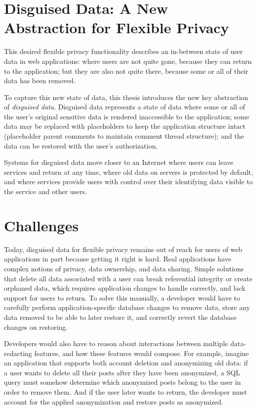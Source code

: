 \section{Disguised Data: A New Abstraction for Flexible Privacy}
%
This desired flexible privacy functionality describes an in-between state of
user data in web applications: where users are not quite gone, because they can
return to the application; but they are also not quite there, because some or
all of their data has been removed.
%

%
To capture this new state of data, this thesis introduces the new key
abstraction of \emph{disguised data}.  Disguised data represents a state of data
where \one{} some or all of the user's original sensitive data is rendered
inaccessible to the application; \two{} some data may be replaced with
placeholders to keep the application structure intact (\eg placeholder parent
comments to maintain comment thread structure); and \three{} the data can be
restored with the user's authorization.
%

%
Systems for disguised data move closer to an Internet where
users can leave services and return at any time, where old data on servers is
protected by default, and where services provide users with control over their
identifying data visible to the service and other users.
%

\section{Challenges} 
Today, disguised data for flexible privacy remains out of reach for users of
web applications in part because getting it right is hard. 
%
Real applications have complex notions of privacy, data ownership, and data
sharing.
%
Simple solutions that \eg delete all data associated with a user can break
referential integrity or create orphaned data, which requires application
changes to handle correctly, and lack support for users to return.
%
To solve this manually, a developer would have to carefully perform
application-specific database changes to remove data, store any data removed to
be able to later restore it, and correctly revert the database changes on
restoring.

%
Developers would also have to reason about interactions between multiple
data-redacting features, and how these features would compose.
%
For example, imagine an application that supports both account deletion and
anonymizing old data: if a user wants to delete all their posts after they have
been anonymized, a SQL query must somehow determine which anonymized posts
belong to the user in order to remove them.
%
And if the user later wants to return, the developer must account for the
applied anonymization and restore posts as anonymized.
%

